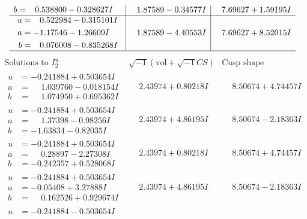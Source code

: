 \documentclass[1p]{elsarticle_modified}
\theoremstyle{definition}
\newcommand{\I}{\sqrt{-1}}
\begin{document}
$$\begin{array}{c|c|c}
\begin{aligned}
b &= \phantom{-}0.538800 - 0.328627 I\end{aligned}
 & \phantom{-}1.87589 - 0.34577 I & \phantom{-}7.69627 + 1.59195 I \\ \hline\begin{aligned}
u &= \phantom{-}0.522984 - 0.315101 I \\
a &= -1.17546 - 1.26609 I \\
b &= \phantom{-}0.076008 - 0.835268 I\end{aligned}
 & \phantom{-}1.87589 - 4.40553 I & \phantom{-}7.69627 + 8.52015 I\\
 \hline 
 \end{array}$$\newpage$$\begin{array}{c|c|c}  
\text{Solutions to }I^u_{2}& \I (\text{vol} + \sqrt{-1}CS) & \text{Cusp shape}\\
 \hline 
\begin{aligned}
u &= -0.241884 + 0.503654 I \\
a &= \phantom{-}1.039760 - 0.018154 I \\
b &= \phantom{-}1.074950 + 0.695362 I\end{aligned}
 & \phantom{-}2.43974 + 0.80218 I & \phantom{-}8.50674 + 4.74457 I \\ \hline\begin{aligned}
u &= -0.241884 + 0.503654 I \\
a &= \phantom{-}1.37398 - 0.98256 I \\
b &= -1.63834 - 0.82035 I\end{aligned}
 & \phantom{-}2.43974 + 4.86195 I & \phantom{-}8.50674 - 2.18363 I \\ \hline\begin{aligned}
u &= -0.241884 + 0.503654 I \\
a &= \phantom{-}0.28897 - 2.27308 I \\
b &= -0.242357 + 0.528068 I\end{aligned}
 & \phantom{-}2.43974 + 0.80218 I & \phantom{-}8.50674 + 4.74457 I \\ \hline\begin{aligned}
u &= -0.241884 + 0.503654 I \\
a &= -0.05408 + 3.27888 I \\
b &= \phantom{-}0.162526 + 0.929674 I\end{aligned}
 & \phantom{-}2.43974 + 4.86195 I & \phantom{-}8.50674 - 2.18363 I \\ \hline\begin{aligned}
u &= -0.241884 - 0.503654 I \\

\end{aligned}
\end{array}$$
\end{document}
